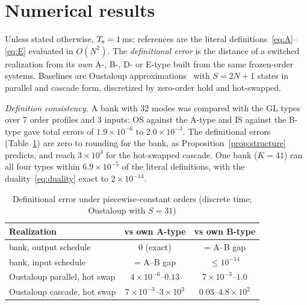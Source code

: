 \section{Numerical results}\label{sec:results}

Unless stated otherwise, $T_{\mathrm{s}}=1$\,ms; references are the literal definitions~\eqref{eq:A}--\eqref{eq:E} evaluated in $O(N^2)$. The \emph{definitional error} is the distance of a switched realization from its \emph{own} A-, B-, D- or E-type built from the same frozen-order systems. Baselines are Oustaloup approximations~\cite{oustaloup2000} with $S=2N+1$ states in parallel and cascade form, discretized by zero-order hold and hot-swapped.

\emph{Definition consistency.} A bank with 32 modes was compared with the GL types over 7 order profiles and 3 inputs: OS against the A-type and IS against the B-type gave total errors of $1.9\times10^{-6}$ to $2.0\times10^{-3}$. The definitional errors (Table~\ref{tab:e1b}) are zero to rounding for the bank, as Proposition~\ref{prop:structure} predicts, and reach $3\times10^3$ for the hot-swapped cascade. One bank ($K=41$) ran all four types within $6.9\times10^{-5}$ of the literal definitions, with the duality~\eqref{eq:duality} exact to $2\times10^{-14}$.

\begin{table}[t]
\caption{Definitional error under piecewise-constant orders (discrete time; Oustaloup with $S=31$)}\label{tab:e1b}
\centering\footnotesize\setlength{\tabcolsep}{3pt}
\begin{tabular}{@{}lcc@{}}
\toprule
Realization & vs own A-type & vs own B-type\\
\midrule
bank, output schedule & 0 (exact) & = A--B gap\\
bank, input schedule & = A--B gap & $\le10^{-14}$\\
Oustaloup parallel, hot swap & $4\times10^{-6}$--$0.13$ & $7\times10^{-3}$--$1.0$\\
Oustaloup cascade, hot swap & $7\times10^{-3}$--$3\times10^{3}$ & $0.03$--$4.8\times10^{2}$\\
\bottomrule
\end{tabular}
\end{table}

